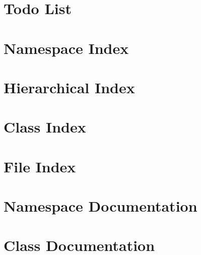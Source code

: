 \let\mypdfximage\pdfximage\def\pdfximage{\immediate\mypdfximage}\documentclass[twoside]{book}
\newcommand{\+}{\discretionary{\mbox{\scriptsize$\hookleftarrow$}}{}{}}
\begin{document}
\chapter{Todo List}
\label{todo}

\chapter{Namespace Index}

\chapter{Hierarchical Index}

\chapter{Class Index}

\chapter{File Index}

\chapter{Namespace Documentation}






\chapter{Class Documentation}

























\end{document}

